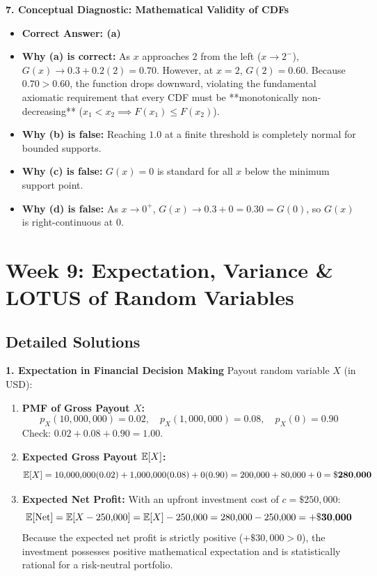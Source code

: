 \textbf{7. Conceptual Diagnostic: Mathematical Validity of CDFs}
\begin{itemize}
    \item \textbf{Correct Answer: (a)}
    \item \textbf{Why (a) is correct:} As $x$ approaches $2$ from the left ($x \to 2^-$), $G(x) \to 0.3 + 0.2(2) = 0.70$. However, at $x = 2$, $G(2) = 0.60$. Because $0.70 > 0.60$, the function drops downward, violating the fundamental axiomatic requirement that every CDF must be **monotonically non-decreasing** ($x_1 < x_2 \implies F(x_1) \le F(x_2)$).
    \item \textbf{Why (b) is false:} Reaching $1.0$ at a finite threshold is completely normal for bounded supports.
    \item \textbf{Why (c) is false:} $G(x) = 0$ is standard for all $x$ below the minimum support point.
    \item \textbf{Why (d) is false:} As $x \to 0^+$, $G(x) \to 0.3 + 0 = 0.30 = G(0)$, so $G(x)$ is right-continuous at $0$.
\end{itemize}


\section*{Week 9: Expectation, Variance \& LOTUS of Random Variables}

\subsection*{Detailed Solutions}

\textbf{1. Expectation in Financial Decision Making}
Payout random variable $X$ (in USD):
\begin{enumerate}
    \item \textbf{PMF of Gross Payout $X$:}
    $$p_X(10{,}000{,}000) = 0.02, \quad p_X(1{,}000{,}000) = 0.08, \quad p_X(0) = 0.90$$
    Check: $0.02 + 0.08 + 0.90 = 1.00$.
    \item \textbf{Expected Gross Payout $\mathbb{E}[X]$:}
    $$\mathbb{E}[X] = 10{,}000{,}000(0.02) + 1{,}000{,}000(0.08) + 0(0.90) = 200{,}000 + 80{,}000 + 0 = \mathbf{\$280{,}000}$$
    \item \textbf{Expected Net Profit:} With an upfront investment cost of $c = \$250{,}000$:
    $$\mathbb{E}[\text{Net}] = \mathbb{E}[X - 250{,}000] = \mathbb{E}[X] - 250{,}000 = 280{,}000 - 250{,}000 = \mathbf{+\$30{,}000}$$
    Because the expected net profit is strictly positive ($+\$30{,}000 > 0$), the investment possesses positive mathematical expectation and is statistically rational for a risk-neutral portfolio.
\end{enumerate}

